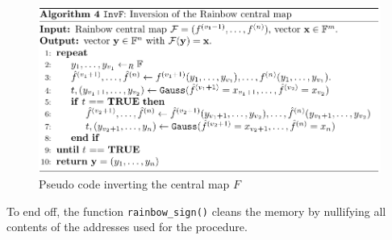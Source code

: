 \begin{figure}[H]
    \centering
    \includegraphics[width=\textwidth]{resources/rainbowinvf.png}
    \caption{Pseudo code inverting the central map $F$}
    \label{rainbowinvf}
\end{figure}
To end off, the function \texttt{rainbow\_sign()} cleans the memory by nullifying all contents of the addresses used for the procedure.

